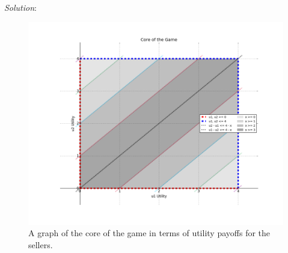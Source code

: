 \documentclass{article}
\begin{document}
\begin{enumerate}
\begin{enumerate}
    \textit{Solution}: \\
    \begin{figure}[h!]
      \centering
      \includegraphics[width=.8\linewidth]{03-a}
      \caption{A graph of the core of the game in terms of utility payoffs for the sellers.}
      \label{fig:05_b}
    \end{figure}

\end{enumerate}
\end{enumerate}
\end{document}
